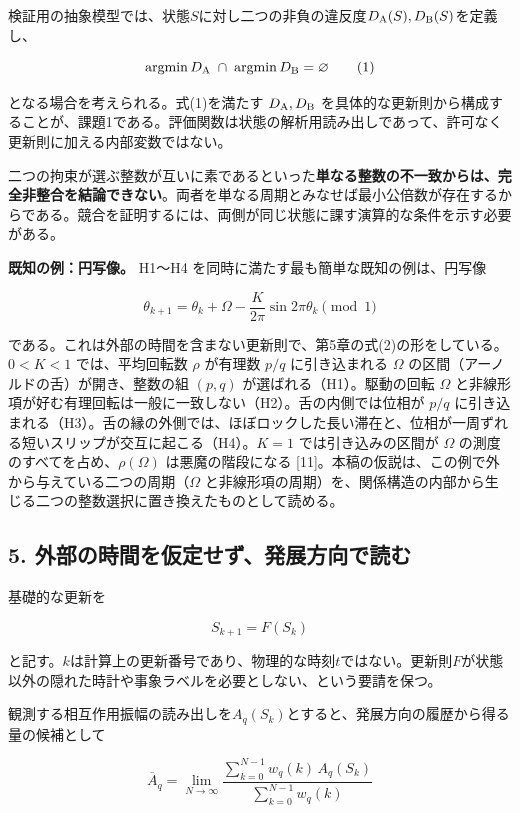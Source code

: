 \documentclass[
  a4paper,
]{ltjsarticle}
\begin{document}
検証用の抽象模型では、状態\(S\)に対し二つの非負の違反度\(D_{\rm A}(S),D_{\rm B}(S)\)を定義し、

\[
\operatorname*{argmin}D_{\rm A}
\;\cap\;
\operatorname*{argmin}D_{\rm B}
=\varnothing
\tag{1}
\]

となる場合を考えられる。式(1)を満たす \(D_{\rm A},D_{\rm B}\)
を具体的な更新則から構成することが、課題1である。評価関数は状態の解析用読み出しであって、許可なく更新則に加える内部変数ではない。

二つの拘束が選ぶ整数が互いに素であるといった\textbf{単なる整数の不一致からは、完全非整合を結論できない}。両者を単なる周期とみなせば最小公倍数が存在するからである。競合を証明するには、両側が同じ状態に課す演算的な条件を示す必要がある。

\textbf{既知の例：円写像。} H1〜H4
を同時に満たす最も簡単な既知の例は、円写像

\[
\theta_{k+1}=\theta_k+\Omega-\frac{K}{2\pi}\sin2\pi\theta_k\pmod 1
\]

である。これは外部の時間を含まない更新則で、第5章の式(2)の形をしている。\(0<K<1\)
では、平均回転数 \(\rho\) が有理数 \(p/q\) に引き込まれる \(\Omega\)
の区間（アーノルドの舌）が開き、整数の組 \((p,q)\)
が選ばれる（H1）。駆動の回転 \(\Omega\)
と非線形項が好む有理回転は一般に一致しない（H2）。舌の内側では位相が
\(p/q\)
に引き込まれる（H3）。舌の縁の外側では、ほぼロックした長い滞在と、位相が一周ずれる短いスリップが交互に起こる（H4）。\(K=1\)
では引き込みの区間が \(\Omega\) の測度のすべてを占め、\(\rho(\Omega)\)
は悪魔の階段になる
{[}11{]}。本稿の仮説は、この例で外から与えている二つの周期（\(\Omega\)
と非線形項の周期）を、関係構造の内部から生じる二つの整数選択に置き換えたものとして読める。

\subsection{5.
外部の時間を仮定せず、発展方向で読む}\label{ux5916ux90e8ux306eux6642ux9593ux3092ux4eeeux5b9aux305bux305aux767aux5c55ux65b9ux5411ux3067ux8aadux3080}

基礎的な更新を

\[
S_{k+1}=F(S_k)
\tag{2}
\]

と記す。\(k\)は計算上の更新番号であり、物理的な時刻\(t\)ではない。更新則\(F\)が状態以外の隠れた時計や事象ラベルを必要としない、という要請を保つ。

観測する相互作用振幅の読み出しを\(A_q(S_k)\)とすると、発展方向の履歴から得る量の候補として

\[
\overline{A}_q
=\lim_{N\to\infty}
\frac{\sum_{k=0}^{N-1}w_q(k)\,A_q(S_k)}
{\sum_{k=0}^{N-1}w_q(k)}
\tag{3}
\]
\end{document}
